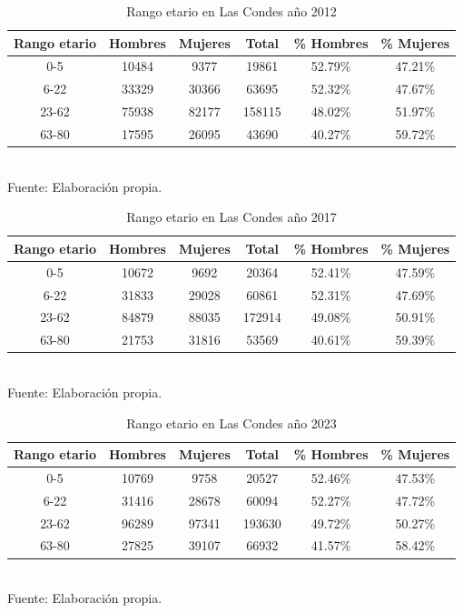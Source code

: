 \documentclass[12pt]{article} %
\begin{document}
\begin{table}[H]
    \centering
    \caption{Rango etario en Las Condes año 2012}
    \begin{tabular}{|c|c|c|c|c|c|}
    \hline
    \textbf{Rango etario} & \textbf{Hombres} & \textbf{Mujeres} & \textbf{Total} & \textbf{\% Hombres} & \textbf{\% Mujeres} \\ \hline
    0-5 & 10484 & 9377 & 19861 & 52.79\% & 47.21\% \\ \hline
    6-22 & 33329 & 30366 & 63695 & 52.32\% & 47.67\% \\ \hline
    23-62 & 75938 & 82177 & 158115 & 48.02\% & 51.97\% \\ \hline
    63-80 & 17595 & 26095 & 43690 & 40.27\% & 59.72\% \\ \hline
    \end{tabular}
    \label{Cuadro 4}
    \\Fuente: Elaboración propia.
\end{table}

\begin{table}[H]
    \centering
    \caption{Rango etario en Las Condes año 2017}
    \begin{tabular}{|c|c|c|c|c|c|}
    \hline
    \textbf{Rango etario} & \textbf{Hombres} & \textbf{Mujeres} & \textbf{Total} & \textbf{\% Hombres} & \textbf{\% Mujeres} \\ \hline
    0-5 & 10672 & 9692 & 20364 & 52.41\% & 47.59\% \\ \hline
    6-22 & 31833 & 29028 & 60861 & 52.31\% & 47.69\% \\ \hline
    23-62 & 84879 & 88035 & 172914 & 49.08\% & 50.91\% \\ \hline
    63-80 & 21753 & 31816 & 53569 & 40.61\% & 59.39\% \\ \hline
    \end{tabular}
    \label{Cuadro 5}
    \\Fuente: Elaboración propia.
\end{table}

\begin{table}[H]
    \centering
    \caption{Rango etario en Las Condes año 2023}
    \begin{tabular}{|c|c|c|c|c|c|}
    \hline
    \textbf{Rango etario} & \textbf{Hombres} & \textbf{Mujeres} & \textbf{Total} & \textbf{\% Hombres} & \textbf{\% Mujeres} \\ \hline
    0-5 & 10769 & 9758 & 20527 & 52.46\% & 47.53\% \\ \hline
    6-22 & 31416 & 28678 & 60094 & 52.27\% & 47.72\% \\ \hline
    23-62 & 96289 & 97341 & 193630 & 49.72\% & 50.27\% \\ \hline
    63-80 & 27825 & 39107 & 66932 & 41.57\% & 58.42\% \\ \hline
    \end{tabular}
    \label{Cuadro 6}
    \\Fuente: Elaboración propia.
\end{table}
\end{document}
